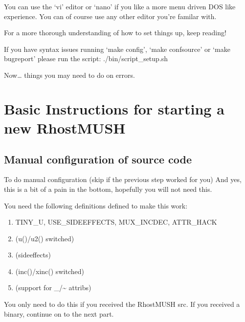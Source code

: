 \documentclass[letterpaper,10pt,english]{sphinxmanual}
\begin{document}
\sphinxAtStartPar
You can use the ‘vi’ editor or ‘nano’ if you like a more menu driven DOS like experience.
You can of course use any other editor you’re familar with.

\sphinxAtStartPar
For a more thorough understanding of how to set things up, keep reading!

\sphinxAtStartPar
If you have syntax issues running ‘make config’, ‘make confsource’
or ‘make bugreport’ please run the script: ./bin/script\_setup.sh

\sphinxAtStartPar
Now… things you may need to do on errors.


\section{Basic Instructions for starting a new RhostMUSH}
\label{\detokenize{install:basic-instructions-for-starting-a-new-rhostmush}}

\subsection{Manual configuration of source code}
\label{\detokenize{install:manual-configuration-of-source-code}}
\sphinxAtStartPar
To do manual configuration (skip if the previous step worked for you) And yes, this is a bit of a pain in the bottom, hopefully you will not need this.

\sphinxAtStartPar
You need the following definitions defined to make this work:
\begin{enumerate}
%
\item {} 
\sphinxAtStartPar
TINY\_U, USE\_SIDEEFFECTS, MUX\_INCDEC, ATTR\_HACK

\item {} 
\sphinxAtStartPar
(u()/u2() switched)

\item {} 
\sphinxAtStartPar
(sideeffects)

\item {} 
\sphinxAtStartPar
(inc()/xinc() switched)

\item {} 
\sphinxAtStartPar
(support for \_/\textasciitilde{} attribs)

\end{enumerate}

\sphinxAtStartPar
You only need to do this if you received the RhostMUSH src.  If you received a binary, continue on to the next part.
\end{document}
